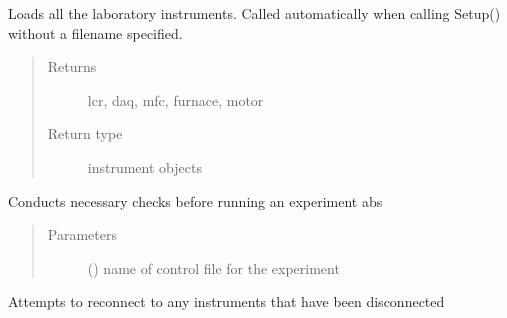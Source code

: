 \documentclass[letterpaper,10pt,english]{sphinxmanual}
\begin{document}
\begin{fulllineitems}
\begin{fulllineitems}
\end{fulllineitems}


\begin{fulllineitems}
\label{\detokenize{source/laboratory:laboratory.setup.Setup.load_instruments}}
Loads all the laboratory instruments. Called automatically when calling Setup() without a filename specified.
\begin{quote}\begin{description}
\item[{Returns}] \leavevmode
lcr, daq, mfc, furnace, motor

\item[{Return type}] \leavevmode
instrument objects

\end{description}\end{quote}

\end{fulllineitems}


\begin{fulllineitems}
\label{\detokenize{source/laboratory:laboratory.setup.Setup.preflight_checklist}}
Conducts necessary checks before running an experiment abs
\begin{quote}\begin{description}
\item[{Parameters}] \leavevmode
{} () \textendash{} name of control file for the experiment

\end{description}\end{quote}

\end{fulllineitems}


\begin{fulllineitems}
\label{\detokenize{source/laboratory:laboratory.setup.Setup.reconnect}}
Attempts to reconnect to any instruments that have been disconnected


\end{fulllineitems}
\end{fulllineitems}
\end{document}

